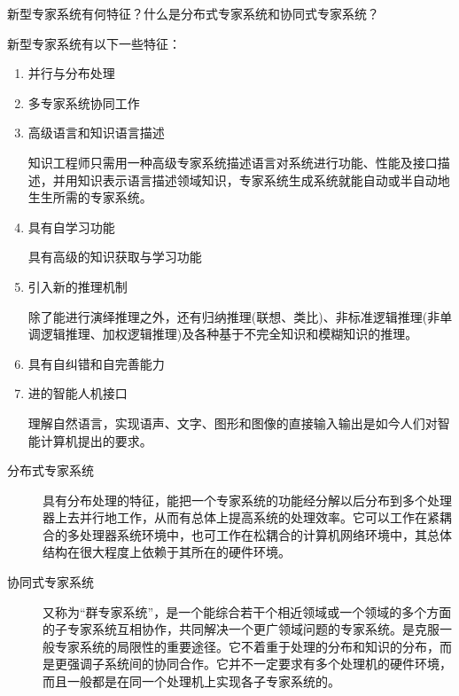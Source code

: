 \begin{question}
新型专家系统有何特征？什么是分布式专家系统和协同式专家系统？ 
\end{question}
\begin{solution}
新型专家系统有以下一些特征：
	\begin{enumerate}
		\item 并行与分布处理
		\item 多专家系统协同工作
		\item 高级语言和知识语言描述 \par
		知识工程师只需用一种高级专家系统描述语言对系统进行功能、性能及接口描述，并用知识表示语言描述领域知识，专家系统生成系统就能自动或半自动地生生所需的专家系统。
		\item 具有自学习功能 \par
		具有高级的知识获取与学习功能 
		\item 引入新的推理机制 \par
		除了能进行演绎推理之外，还有归纳推理(联想、类比)、非标准逻辑推理(非单调逻辑推理、加权逻辑推理)及各种基于不完全知识和模糊知识的推理。
		\item 具有自纠错和自完善能力 
		\item 进的智能人机接口 \par
		理解自然语言，实现语声、文字、图形和图像的直接输入输出是如今人们对智能计算机提出的要求。 
	\end{enumerate}
	\begin{description}
		\item[分布式专家系统]
		具有分布处理的特征，能把一个专家系统的功能经分解以后分布到多个处理器上去并行地工作，从而有总体上提高系统的处理效率。它可以工作在紧耦合的多处理器系统环境中，也可工作在松耦合的计算机网络环境中，其总体结构在很大程度上依赖于其所在的硬件环境。 
		\item[协同式专家系统]
		又称为“群专家系统”，是一个能综合若干个相近领域或一个领域的多个方面的子专家系统互相协作，共同解决一个更广领域问题的专家系统。是克服一般专家系统的局限性的重要途径。它不着重于处理的分布和知识的分布，而是更强调子系统间的协同合作。它并不一定要求有多个处理机的硬件环境，而且一般都是在同一个处理机上实现各子专家系统的。
	\end{description}
\end{solution}

